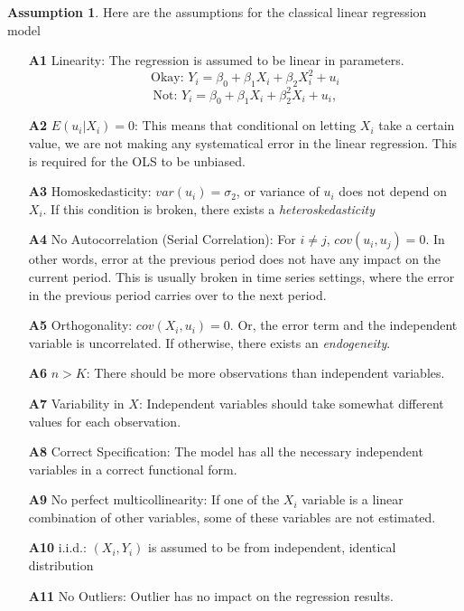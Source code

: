 \documentclass[12pt]{article}
\theoremstyle{definition}
\theoremstyle{property}
\theoremstyle{assumption}
\newtheorem{assumption}{Assumption}[section]
\theoremstyle{example}
\theoremstyle{comment}
\begin{document}
\begin{mdframed}[backgroundcolor=blue!5] 
\begin{assumption} Here are the assumptions for the classical linear regression model
\begin{itemize}
\item[\textbf{A1}] Linearity: The regression is assumed to be linear in parameters.
\[
\text{Okay: } Y_i = \beta_0 + \beta_1X_i + \beta_2X_i^2+u_i 
\]
\[
\text{Not: } Y_i = \beta_0 + \beta_1X_i + \beta_2^2X_i+u_i,
\]

\item[\textbf{A2}] $E(u_i|X_i)=0$: This means that conditional on letting $X_i$ take a certain value, we are not making any systematical error in the linear regression. This is required for the OLS to be unbiased. 
\item[\textbf{A3}] Homoskedasticity: $var(u_i)=\sigma_2$, or variance of $u_i$ does not depend on $X_i$. If this condition is broken, there exists a \textit{heteroskedasticity}
\item[\textbf{A4}] No Autocorrelation (Serial Correlation): For $i\neq j$, $cov(u_i,u_j)=0$. In other words, error at the previous period does not have any impact on the current period. This is usually broken in time series settings, where the error in the previous period carries over to the next period.
\item[\textbf{A5}] Orthogonality: $cov(X_i,u_i)=0$. Or, the error term and the independent variable is uncorrelated. If otherwise, there exists an \textit{endogeneity}.

\item[\textbf{A6}] $n>K$: There should be more observations than independent variables.
\item[\textbf{A7}] Variability in $X$: Independent variables should take somewhat different values for each observation. 
\item[\textbf{A8}] Correct Specification: The model has all the necessary independent variables in a correct functional form.
\item[\textbf{A9}] No perfect multicollinearity: If one of the $X_i$ variable is a linear combination of other variables, some of these variables are not estimated.
\item[\textbf{A10}] i.i.d.: $(X_i,Y_i)$ is assumed to be from independent, identical distribution

\item[\textbf{A11}] No Outliers: Outlier has no impact on the regression results.



\end{itemize}
\end{assumption}
\end{mdframed}
\end{document}
